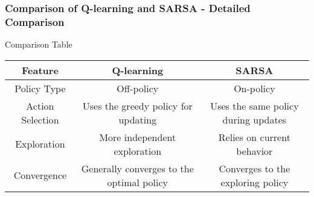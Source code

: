 \documentclass[aspectratio=169]{beamer}
\begin{document}
\begin{frame}[fragile]
    \frametitle{Comparison of Q-learning and SARSA - Detailed Comparison}
    \begin{block}{Comparison Table}
        \begin{tabular}{|c|c|c|}
            \hline
            \textbf{Feature} & \textbf{Q-learning} & \textbf{SARSA} \\
            \hline
            Policy Type & Off-policy & On-policy \\
            \hline
            Action Selection & Uses the greedy policy for updating & Uses the same policy during updates \\
            \hline
            Exploration & More independent exploration & Relies on current behavior \\
            \hline
            Convergence & Generally converges to the optimal policy & Converges to the exploring policy \\
            \hline
        \end{tabular}
    \end{block}
\end{frame}
\end{document}
